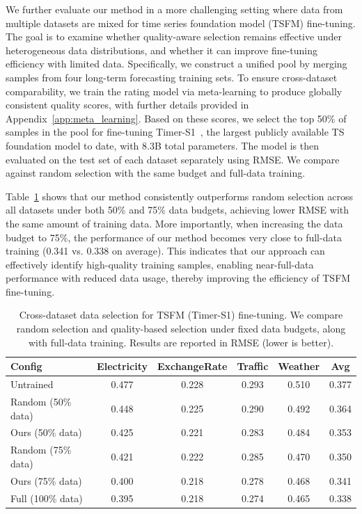 \documentclass{article}
\begin{document}
We further evaluate our method in a more challenging setting where data from multiple datasets are mixed for time series foundation model (TSFM) fine-tuning. The goal is to examine whether quality-aware selection remains effective under heterogeneous data distributions, and whether it can improve fine-tuning efficiency with limited data.
Specifically, we construct a unified pool by merging samples from four long-term forecasting training sets. To ensure cross-dataset comparability, we train the rating model via meta-learning to produce globally consistent quality scores, with further details provided in Appendix~\ref{app:meta_learning}. Based on these scores, we select the top 50\% of samples in the pool for fine-tuning Timer-S1~\citep{liu2026timer}, the largest publicly available TS foundation model to date, with 8.3B total parameters. The model is then evaluated on the test set of each dataset separately using RMSE. We compare against random selection with the same budget and full-data training.

Table~\ref{tab:cross_dataset_tsfm} shows that our method consistently outperforms random selection across all datasets under both 50\% and 75\% data budgets, achieving lower RMSE with the same amount of training data. More importantly, when increasing the data budget to 75\%, the performance of our method becomes very close to full-data training (0.341 vs. 0.338 on average). This indicates that our approach can effectively identify high-quality training samples, enabling near-full-data performance with reduced data usage, thereby improving the efficiency of TSFM fine-tuning.

\begin{table}[!htbp]
  \caption{Cross-dataset data selection for TSFM (Timer-S1) fine-tuning. We compare random selection and quality-based selection under fixed data budgets, along with full-data training. Results are reported in RMSE (lower is better).}
  \label{tab:cross_dataset_tsfm}
  \centering
  \footnotesize
  \setlength{\tabcolsep}{4pt}
  \begin{tabular}{l | c c c c | c}
    \toprule
    \textbf{Config} & \textbf{Electricity} & \textbf{ExchangeRate} & \textbf{Traffic} & \textbf{Weather} & \textbf{Avg} \\
    \midrule
    Untrained & 0.477 & 0.228 & 0.293 & 0.510 & 0.377 \\
    \midrule
    Random (50\% data) & 0.448 & 0.225 & 0.290 & 0.492 & 0.364 \\
    \rowcolor{cyan!10}
    Ours (50\% data) & 0.425 & 0.221 & 0.283 & 0.484 & 0.353 \\
    \midrule
    Random (75\% data) & 0.421 & 0.222 & 0.285 & 0.470 & 0.350 \\
    \rowcolor{cyan!10}
    Ours (75\% data) & 0.400 & 0.218 & 0.278 & 0.468 & 0.341 \\
    \midrule
    Full (100\% data) & 0.395 & 0.218 & 0.274 & 0.465 & 0.338 \\
    \bottomrule
  \end{tabular}
\end{table}
\end{document}
